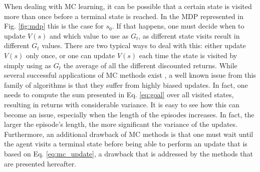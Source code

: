 When dealing with MC learning, it can be possible that a certain state is visited more than once before a terminal state is reached. In the MDP represented in Fig. \ref{fig:mdp} this is the case for $s_0$. If that happens, one must decide when to update $V(s)$ and which value to use as $G_t$, as different state visits result in different $G_t$ values. There are two typical ways to deal with this: either update $V(s)$ only once, or one can update $V(s)$ each time the state is visited by simply using as $G_t$ the average of all the different discounted returns. 
While several successful applications of MC methods exist \cite{jaakkola1995reinforcement,liu1998sequential,lazaric2007reinforcement}, a well known issue from this family of algorithms is that they suffer from highly biased updates. In fact, one needs to compute the sum presented in Eq. \ref{eq:goal} over all visited states, resulting in returns with considerable variance. It is easy to see how this can become an issue, especially when the length of the episodes increases. In fact, the larger the episode's length, the more significant the variance of the updates. Furthermore, an additional drawback of MC methods is that one must wait until the agent visits a terminal state before being able to perform an update that is based on Eq. \ref{eq:mc_update}, a drawback that is addressed by the methods that are presented hereafter.   

